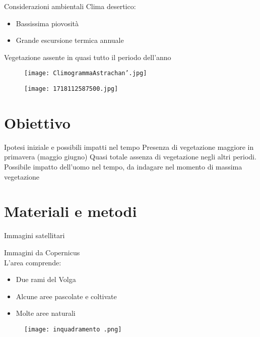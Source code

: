 \documentclass{beamer} %
\begin{document}
\begin{frame}{Considerazioni ambientali} %
Clima desertico: 
    \begin{itemize}
        \item Bassissima piovosità
        \item Grande escursione termica annuale 
\end{itemize}
Vegetazione assente in quasi tutto il periodo dell'anno 

\begin{multicols}{2}
\begin{figure}
    \centering
    \texttt{[image: ClimogrammaAstrachan'.jpg]}
    \label{fig:enter-label}
\end{figure}
\columnbreak
\begin{figure}
    \centering
    \texttt{[image: 1718112587500.jpg]}
    \label{fig:enter-label}
\end{figure}
\end{multicols}

\end{frame}

\section{Obiettivo}

\begin{frame}{Ipotesi iniziale e possibili impatti nel tempo}
Presenza di vegetazione maggiore in primavera (maggio giugno)
Quasi totale assenza di vegetazione negli altri periodi. \\
\bigskip 
Possibile impatto dell'uomo nel tempo, da indagare nel momento di massima vegetazione
\end{frame}


\section{Materiali e metodi}

\begin{frame}{Immagini satellitari}
\begin{multicols}{2}

Immagini da Copernicus\\
L'area comprende: 
	\begin{itemize}
		\item Due rami del Volga 
		\item Alcune aree pascolate e coltivate 
		\item Molte aree naturali
	\end{itemize}
\columnbreak

\begin{figure}
    \centering
    \texttt{[image: inquadramento .png]}

    \label{fig:enter-label}
\end{figure}

\end{multicols}

\end{frame}
\end{document}
